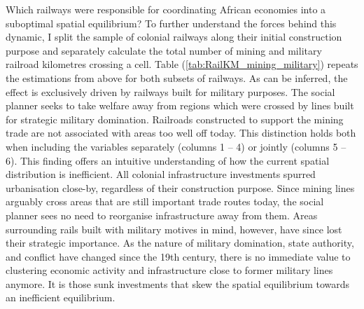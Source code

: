 \documentclass[11pt, oneside]{article}   	%
\let\oldref\ref
\renewcommand{\ref}[1]{(\oldref{#1})}
\begin{document}
Which railways were responsible for coordinating African economies into a suboptimal spatial equilibrium? To further understand the forces behind this dynamic, I split the sample of colonial railways along their initial construction purpose and separately calculate the total number of mining and military railroad kilometres crossing a cell. Table \ref{tab:RailKM_mining_military} repeats the estimations from above for both subsets of railways. As can be inferred, the effect is exclusively driven by railways built for military purposes. The social planner seeks to take welfare away from regions which were crossed by lines built for strategic military domination. Railroads constructed to support the mining trade are not associated with areas too well off today. This distinction holds both when including the variables separately (columns 1 -- 4) or jointly (columns 5 -- 6). This finding offers an intuitive understanding of how the current spatial distribution is inefficient. All colonial infrastructure investments spurred urbanisation close-by, regardless of their construction purpose. Since mining lines arguably cross areas that are still important trade routes today, the social planner sees no need to reorganise infrastructure away from them. Areas surrounding rails built with military motives in mind, however, have since lost their strategic importance. As the nature of military domination, state authority, and conflict have changed since the 19th century, there is no immediate value to clustering economic activity and infrastructure close to former military lines anymore. It is those sunk investments that skew the spatial equilibrium towards an inefficient equilibrium.
\end{document}
